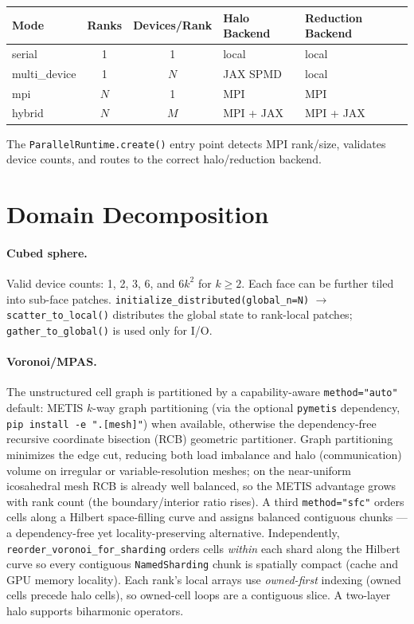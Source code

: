 \documentclass[11pt,twoside]{report}
\begin{document}
\begin{center}
\begin{tabular}{lccll}
\toprule
Mode & Ranks & Devices/Rank & Halo Backend & Reduction Backend \\
\midrule
serial & 1 & 1 & local & local \\
multi\_device & 1 & $N$ & JAX SPMD & local \\
mpi & $N$ & 1 & MPI & MPI \\
hybrid & $N$ & $M$ & MPI + JAX & MPI + JAX \\
\bottomrule
\end{tabular}
\end{center}

The \texttt{ParallelRuntime.create()} entry point detects MPI rank/size,
validates device counts, and routes to the correct halo/reduction backend.

\section{Domain Decomposition}

\paragraph{Cubed sphere.}
Valid device counts: 1, 2, 3, 6, and $6k^2$ for $k\ge 2$.
Each face can be further tiled into sub-face patches.
\texttt{initialize\_distributed(global\_n=N)} $\to$
\texttt{scatter\_to\_local()} distributes the global state to rank-local
patches; \texttt{gather\_to\_global()} is used only for I/O.

\paragraph{Voronoi/MPAS.}
The unstructured cell graph is partitioned by a capability-aware
\texttt{method="auto"} default: METIS $k$-way graph partitioning (via the
optional \texttt{pymetis} dependency, \texttt{pip install -e ".[mesh]"}) when
available, otherwise the dependency-free recursive coordinate bisection (RCB)
geometric partitioner.  Graph partitioning minimizes the edge cut, reducing both
load imbalance and halo (communication) volume on irregular or
variable-resolution meshes; on the near-uniform icosahedral mesh RCB is already
well balanced, so the METIS advantage grows with rank count (the
boundary/interior ratio rises).  A third \texttt{method="sfc"} orders cells along
a Hilbert space-filling curve and assigns balanced contiguous chunks --- a
dependency-free yet locality-preserving alternative.  Independently,
\texttt{reorder\_voronoi\_for\_sharding} orders cells \emph{within} each shard
along the Hilbert curve so every contiguous \texttt{NamedSharding} chunk is
spatially compact (cache and GPU memory locality).  Each rank's local arrays use
\emph{owned-first} indexing (owned cells precede halo cells), so owned-cell loops
are a contiguous slice.  A two-layer halo supports biharmonic operators.
\end{document}
